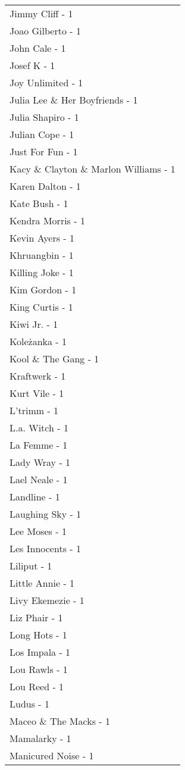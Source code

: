 \documentclass[
]{article}
\begin{document}
\begin{longtable}{l}
Jimmy Cliff - 1 \\ 
Joao Gilberto - 1 \\ 
John Cale - 1 \\ 
Josef K - 1 \\ 
Joy Unlimited - 1 \\ 
Julia Lee \& Her Boyfriends - 1 \\ 
Julia Shapiro - 1 \\ 
Julian Cope - 1 \\ 
Just For Fun - 1 \\ 
Kacy \& Clayton \& Marlon Williams - 1 \\ 
Karen Dalton - 1 \\ 
Kate Bush - 1 \\ 
Kendra Morris - 1 \\ 
Kevin Ayers - 1 \\ 
Khruangbin - 1 \\ 
Killing Joke - 1 \\ 
Kim Gordon - 1 \\ 
King Curtis - 1 \\ 
Kiwi Jr. - 1 \\ 
Koleżanka - 1 \\ 
Kool \& The Gang - 1 \\ 
Kraftwerk - 1 \\ 
Kurt Vile - 1 \\ 
L'trimm - 1 \\ 
L.a. Witch - 1 \\ 
La Femme - 1 \\ 
Lady Wray - 1 \\ 
Lael Neale - 1 \\ 
Landline - 1 \\ 
Laughing Sky - 1 \\ 
Lee Moses - 1 \\ 
Les Innocents - 1 \\ 
Liliput - 1 \\ 
Little Annie - 1 \\ 
Livy Ekemezie - 1 \\ 
Liz Phair - 1 \\ 
Long Hots - 1 \\ 
Los Impala - 1 \\ 
Lou Rawls - 1 \\ 
Lou Reed - 1 \\ 
Ludus - 1 \\ 
Maceo \& The Macks - 1 \\ 
Mamalarky - 1 \\ 
Manicured Noise - 1 \\ 

\end{longtable}
\end{document}
